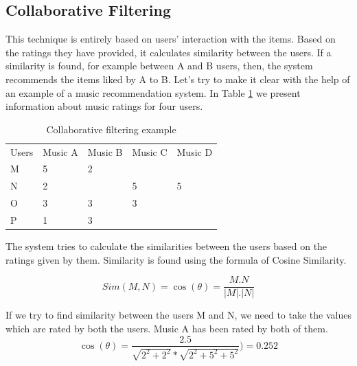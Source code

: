 \documentclass{jot}
\begin{document}
\subsection{Collaborative Filtering}
This technique is entirely based on users' interaction with the items. Based on the ratings they have provided, it calculates similarity between the users. If a similarity is found, for example between A and B users, then, the system recommends the items liked by A to B.
Let’s try to make it clear with the help  of an example of a music recommendation system. In Table \ref{tab:collaborative-filtering} we present information about music ratings for four users.\\

\begin{table}[h!]
\centering
\begin{tabular}{lllll}
Users & Music A & Music B & Music C & Music D \\
M     & 5       & 2       &         &         \\
N     & 2       &         & 5       & 5       \\
O     & 3       & 3       & 3       &         \\
P     & 1       & 3       &         &         \\
\end{tabular}
\caption{Collaborative filtering example}
\label{tab:collaborative-filtering}
\end{table}

The system tries to calculate the similarities between the users based on the ratings given by them. Similarity is found using the formula of Cosine Similarity.

\[Sim(M,N) = \cos (\theta) = \frac{M.N}{|M|.|N|}\]

If we try to find similarity between the users M and N, we need to take the values which are rated by both the users. Music A has been rated by both of them.
\[\cos(\theta) = \frac{2.5}{\sqrt{2^2+2^2} * \sqrt{2^2 + 5^2 + 5^2}}) = 0.252\]
\end{document}
